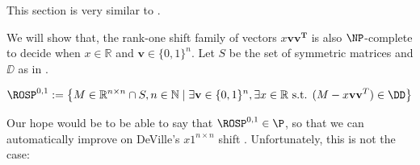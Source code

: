 This section is very similar to .

We will show that, the rank-one shift family of vectors $x \mathbf{vv^T}$ is also $\NP$-complete to decide when $x\in\mathbb{R}$ and $\mathbf{v}\in\{0,1\}^n$. Let $S$ be the set of symmetric matrices and $\DD$ as in .

\begin{definition}[$\ROSP^{0,1}$]
\label{def:rank_one_zero_vector}
	\begin{equation}
		\ROSP^{0,1} := \left\{M \in \mathbb{R}^{n\times n} \cap S, 	n\in\mathbb{N} \;\vert\; \exists \mathbf{v}\in \{0,1\}^n, \exists x\in\mathbb{R} \text{ s.t. } (M - x \mathbf{vv}^T) \in \DD \right\}
	\end{equation}
\end{definition}

Our hope would be to be able to say that $\ROSP^{0,1}\in\P$, so that we can automatically improve on DeVille's $x1^{n\times n}$ shift \cite{deville_optimizing_2019}. Unfortunately, this is not the case:

